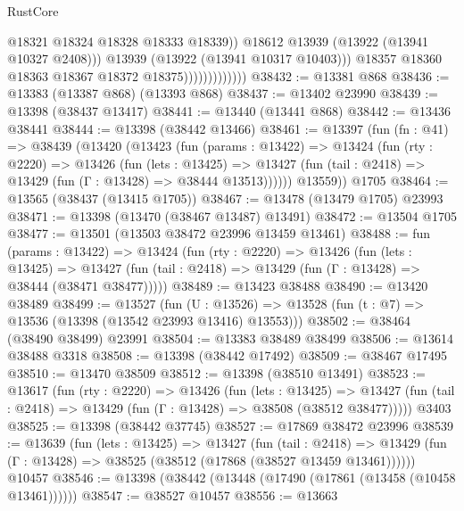 \begin{lexlean}{RustCore}
\begin{coremodule}
                                      @18321
                                      @18324
                                      @18328
                                      @18333
                                      @18339))
                                  @18612
                                  @13939
                                  (@13922 (@13941 @10327 @2408)))
                                @13939
                                (@13922 (@13941 @10317 @10403)))
                              @18357
                              @18360
                              @18363
                              @18367
                              @18372
                              @18375)))))))))))))
@38432 := @13381 @868
@38436 := @13383 (@13387 @868) (@13393 @868)
@38437 := @13402 @23990
@38439 := @13398 (@38437 @13417)
@38441 := @13440 (@13441 @868)
@38442 := @13436 @38441
@38444 := @13398 (@38442 @13466)
@38461 := @13397
    (fun (fn : @41) =>
    @38439
      (@13420
        (@13423
          (fun (params : @13422) =>
          @13424
            (fun (rty : @2220) =>
            @13426
              (fun (lets : @13425) =>
              @13427 (fun (tail : @2418) => @13429 (fun (Γ : @13428) => @38444 @13513))))))
        @13559))
    @1705
@38464 := @13565 (@38437 (@13415 @1705))
@38467 := @13478 (@13479 @1705) @23993
@38471 := @13398 (@13470 (@38467 @13487) @13491)
@38472 := @13504 @1705
@38477 := @13501 (@13503 @38472 @23996 @13459 @13461)
@38488 := fun (params : @13422) =>
  @13424
    (fun (rty : @2220) =>
    @13426
      (fun (lets : @13425) =>
      @13427 (fun (tail : @2418) => @13429 (fun (Γ : @13428) => @38444 (@38471 @38477)))))
@38489 := @13423 @38488
@38490 := @13420 @38489
@38499 := @13527
    (fun (U : @13526) => @13528 (fun (t : @7) => @13536 (@13398 (@13542 @23993 @13416) @13553)))
@38502 := @38464 (@38490 @38499) @23991
@38504 := @13383 @38489 @38499
@38506 := @13614 @38488 @3318
@38508 := @13398 (@38442 @17492)
@38509 := @38467 @17495
@38510 := @13470 @38509
@38512 := @13398 (@38510 @13491)
@38523 := @13617
    (fun (rty : @2220) =>
    @13426
      (fun (lets : @13425) =>
      @13427 (fun (tail : @2418) => @13429 (fun (Γ : @13428) => @38508 (@38512 @38477)))))
    @3403
@38525 := @13398 (@38442 @37745)
@38527 := @17869 @38472 @23996
@38539 := @13639
    (fun (lets : @13425) =>
    @13427
      (fun (tail : @2418) =>
      @13429 (fun (Γ : @13428) => @38525 (@38512 (@17868 (@38527 @13459 @13461))))))
    @10457
@38546 := @13398 (@38442 (@13448 (@17490 (@17861 (@13458 (@10458 @13461))))))
@38547 := @38527 @10457
@38556 := @13663

\end{coremodule}
\end{lexlean}
